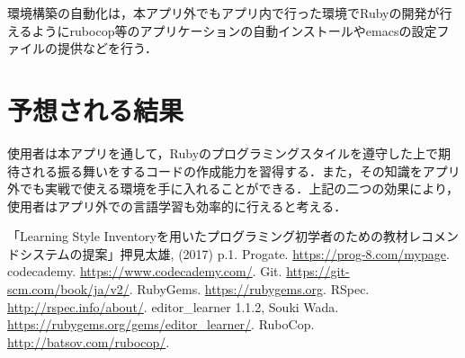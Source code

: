 \documentclass[a4j,twocolumn]{jsarticle}
\begin{document}
環境構築の自動化は，本アプリ外でもアプリ内で行った環境でRubyの開発が行えるようにrubocop等のアプリケーションの自動インストールやemacsの設定ファイルの提供などを行う．

\section{予想される結果}
使用者は本アプリを通して，Rubyのプログラミングスタイルを遵守した上で期待される振る舞いをするコードの作成能力を習得する．また，その知識をアプリ外でも実戦で使える環境を手に入れることができる．上記の二つの効果により，使用者はアプリ外での言語学習も効率的に行えると考える．

\vspace{0.5\baselineskip}

{\small\setlength\baselineskip{10pt}    %
\begin{thebibliography}{9} 
 「Learning Style Inventoryを用いたプログラミング初学者のための教材レコメンドシステムの提案」押見太雄, (2017) p.1.
 Progate. \url{https://prog-8.com/mypage}.
 codecademy. \url{https://www.codecademy.com/}.
  Git. \url{https://git-scm.com/book/ja/v2/}.
 RubyGems. \url{https://rubygems.org}.
 RSpec. \url{http://rspec.info/about/}.
 editor\_learner 1.1.2, Souki Wada. \url{https://rubygems.org/gems/editor_learner/}.
 RuboCop. \url{http://batsov.com/rubocop/}.
\end{thebibliography}
}
\end{document}
